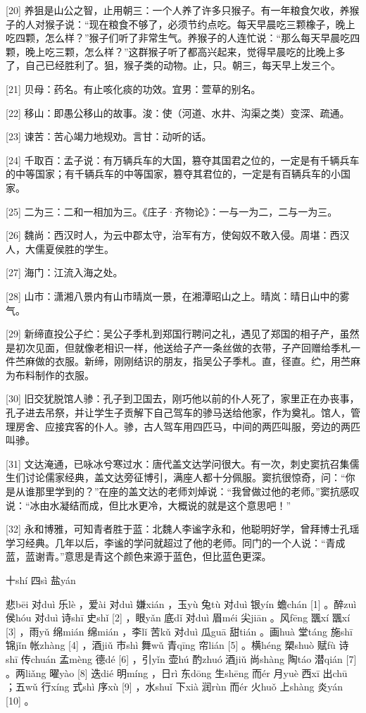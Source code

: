 \documentclass[12pt,UTF8]{ctexbook}
\begin{document}
[20] 养狙是山公之智，止用朝三：一个人养了许多只猴子。有一年粮食欠收，养猴子的人对猴子说：“现在粮食不够了，必须节约点吃。每天早晨吃三颗橡子，晚上吃四颗，怎么样？”猴子们听了非常生气。养猴子的人连忙说：“那么每天早晨吃四颗，晚上吃三颗，怎么样？”这群猴子听了都高兴起来，觉得早晨吃的比晚上多了，自己已经胜利了。狙，猴子类的动物。止，只。朝三，每天早上发三个。

[21] 贝母：药名。有止咳化痰的功效。宜男：萱草的别名。

[22] 移山：即愚公移山的故事。浚：使（河道、水井、沟渠之类）变深、疏通。

[23] 谏苦：苦心竭力地规劝。言甘：动听的话。

[24] 千取百：孟子说：有万辆兵车的大国，篡夺其国君之位的，一定是有千辆兵车的中等国家；有千辆兵车的中等国家，篡夺其君位的，一定是有百辆兵车的小国家。

[25] 二为三：二和一相加为三。《庄子·齐物论》：一与一为二，二与一为三。

[26] 魏尚：西汉时人，为云中郡太守，治军有方，使匈奴不敢入侵。周堪：西汉人，大儒夏侯胜的学生。

[27] 海门：江流入海之处。

[28] 山市：潇湘八景内有山市晴岚一景，在湘潭昭山之上。晴岚：晴日山中的雾气。

[29] 新缔直投公子纻：吴公子季札到郑国行聘问之礼，遇见了郑国的相子产，虽然是初次见面，但就像老相识一样，他送给子产一条丝做的衣带，子产回赠给季札一件苎麻做的衣服。新缔，刚刚结识的朋友，指吴公子季札。直，径直。纻，用苎麻为布料制作的衣服。

[30] 旧交犹脱馆人骖：孔子到卫国去，刚巧他以前的仆人死了，家里正在办丧事，孔子进去吊祭，并让学生子贡解下自己驾车的骖马送给他家，作为奠礼。馆人，管理房舍、应接宾客的仆人。骖，古人驾车用四匹马，中间的两匹叫服，旁边的两匹叫骖。

[31] 文达淹通，已咏冰兮寒过水：唐代盖文达学问很大。有一次，刺史窦抗召集儒生们讨论儒家经典，盖文达旁征博引，满座人都十分佩服。窦抗很惊奇，问：“你是从谁那里学到的？”在座的盖文达的老师刘焯说：“我曾做过他的老师。”窦抗感叹说：“冰由水凝结而成，但比水更冷，大概说的就是这个意思吧！”

[32] 永和博雅，可知青者胜于蓝：北魏人李谧字永和，他聪明好学，曾拜博士孔瑶学习经典。几年以后，李谧的学问就超过了他的老师。同门的一个人说：“青成蓝，蓝谢青。”意思是青这个颜色来源于蓝色，但比蓝色更深。





十shí 四sì 盐yán


悲bēi 对duì 乐lè ，爱ài 对duì 嫌xián ，玉yù 兔tù 对duì 银yín 蟾chán [1] 。醉zuì 侯hóu 对duì 诗shī 史shǐ [2] ，眼yǎn 底dǐ 对duì 眉méi 尖jiān 。风fēng 飁xí 飁xí [3] ，雨yǔ 绵mián 绵mián ，李lǐ 苦kǔ 对duì 瓜guā 甜tián 。画huà 堂táng 施shī 锦jǐn 帐zhàng [4] ，酒jiǔ 市shì 舞wǔ 青qīng 帘lián [5] 。横héng 槊shuò 赋fù 诗shī 传chuán 孟mèng 德dé [6] ，引yǐn 壶hú 酌zhuó 酒jiǔ 尚shàng 陶táo 潜qián [7] 。两liǎng 曜yào [8] 迭dié 明míng ，日rì 东dōng 生shēng 而ér 月yuè 西xī 出chū ；五wǔ 行xíng 式shì 序xù [9] ，水shuǐ 下xià 润rùn 而ér 火huǒ 上shàng 炎yán [10] 。
\end{document}
